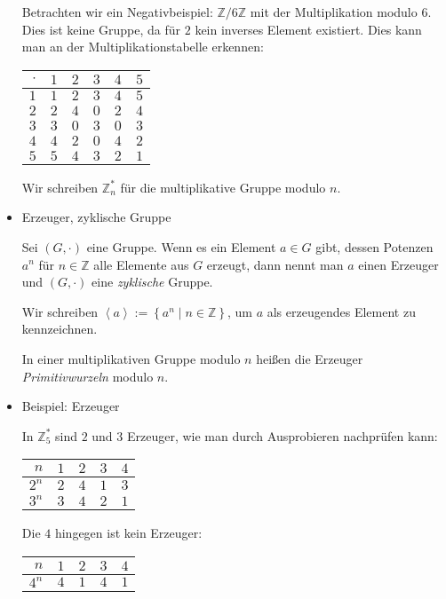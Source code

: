 \documentclass[
  a4paper,
  11pt,
]{article}
\newcommand{\Z}{\mathbb{Z}}
\begin{document}
\begin{itemize}
    Betrachten wir ein Negativbeispiel: $\Z/6\Z$ mit der Multiplikation modulo
    $6$. Dies ist keine Gruppe, da für $2$ kein inverses Element existiert. Dies
    kann man an der Multiplikationstabelle erkennen:
    \begin{center}
      \begin{tabular}{r|ccccc}
        $\cdot$ & $1$ & $2$ & $3$ & $4$ & $5$\\\hline
        $1$     & $1$ & $2$ & $3$ & $4$ & $5$\\
        $2$     & $2$ & $4$ & $0$ & $2$ & $4$\\
        $3$     & $3$ & $0$ & $3$ & $0$ & $3$\\
        $4$     & $4$ & $2$ & $0$ & $4$ & $2$\\
        $5$     & $5$ & $4$ & $3$ & $2$ & $1$
      \end{tabular}
    \end{center}

    Wir schreiben $\Z_n^*$ für die multiplikative Gruppe modulo $n$.

  \item Erzeuger, zyklische Gruppe

    Sei $(G, \cdot)$ eine Gruppe. Wenn es ein Element $a \in G$ gibt, dessen
    Potenzen $a^n$ für $n \in \Z$ alle Elemente aus $G$ erzeugt, dann nennt man
    $a$ einen Erzeuger und $(G, \cdot)$ eine \emph{zyklische} Gruppe.

    Wir schreiben $\left\langle a \right\rangle := \left\{ a^n \mid n \in \Z
    \right\}$, um $a$ als erzeugendes Element zu kennzeichnen.

    In einer multiplikativen Gruppe modulo $n$ heißen die Erzeuger
    \emph{Primitivwurzeln} modulo $n$.

  \item Beispiel: Erzeuger

    In $\Z_5^*$ sind $2$ und $3$ Erzeuger, wie man durch Ausprobieren nachprüfen
    kann:
    \begin{center}
      \begin{tabular}{r|rrrr}
        $n$   & $1$ & $2$ & $3$ & $4$\\\hline
        $2^n$ & $2$ & $4$ & $1$ & $3$\\
        $3^n$ & $3$ & $4$ & $2$ & $1$
      \end{tabular}
    \end{center}
    Die $4$ hingegen ist kein Erzeuger:
    \begin{center}
      \begin{tabular}{r|rrrr}
        $n$   & $1$ & $2$ & $3$ & $4$\\\hline
        $4^n$ & $4$ & $1$ & $4$ & $1$
      \end{tabular}
    \end{center}

\end{itemize}
\end{document}
